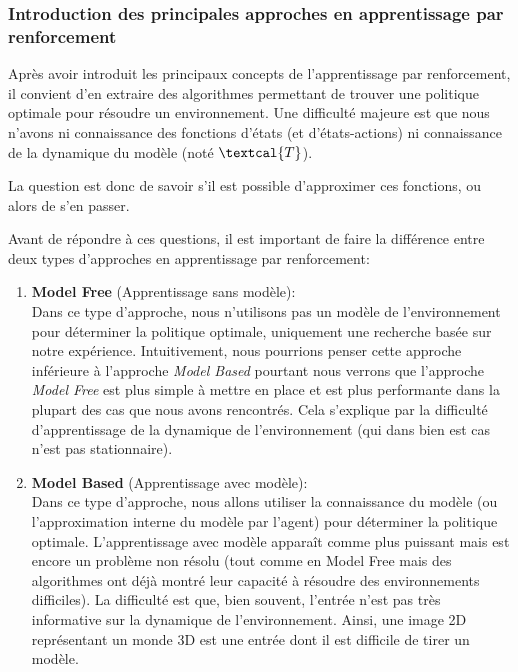\subsubsection{Introduction des principales approches en apprentissage par renforcement}

Après avoir introduit les principaux concepts de l'apprentissage par renforcement, il convient d'en extraire des algorithmes permettant de trouver une politique optimale pour résoudre un environnement. Une difficulté majeure est que nous n'avons ni connaissance des fonctions d'états (et d'états-actions) ni connaissance de la dynamique du modèle (noté $\textcal{T}$).

La question est donc de savoir s'il est possible d'approximer ces fonctions, ou alors de s'en passer.

Avant de répondre à ces questions, il est important de faire la différence entre deux types d'approches en apprentissage par renforcement: 

\begin{enumerate}
    \item \textbf{Model Free} (Apprentissage sans modèle): \\
        Dans ce type d'approche, nous n'utilisons pas un modèle de l'environnement pour déterminer la politique optimale, uniquement une recherche basée sur notre expérience. Intuitivement, nous pourrions penser cette approche inférieure à l'approche \emph{Model Based} pourtant nous verrons que l'approche \emph{Model Free} est plus simple à mettre en place et est plus performante dans la plupart des cas que nous avons rencontrés. Cela s'explique par la difficulté d'apprentissage de la dynamique de l'environnement (qui dans bien est cas n'est pas stationnaire).
    
    \item \textbf{Model Based} (Apprentissage avec modèle): \\
        Dans ce type d'approche, nous allons utiliser la connaissance du modèle (ou l'approximation interne du modèle par l'agent) pour déterminer la politique optimale. L'apprentissage avec modèle apparaît comme plus puissant mais est encore un problème non résolu (tout comme en Model Free mais des algorithmes ont déjà montré leur capacité à résoudre des environnements difficiles). La difficulté est que, bien souvent, l'entrée n'est pas très informative sur la dynamique de l'environnement. Ainsi, une image 2D représentant un monde 3D est une entrée dont il est difficile de tirer un modèle.
\end{enumerate}

